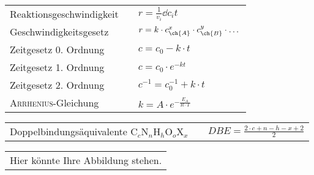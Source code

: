 \documentclass[./main.tex]{subfiles}
\begin{document}
\begin{formulabox}[Kinetik]
  \begin{center}
  \renewcommand{\arraystretch}{1.4}
    \begin{tabular}{>{\raggedleft\arraybackslash}p{} p{}p{}}
        Reaktionsgeschwindigkeit & & $\displaystyle r=\frac{1}{v_i}\dd{c_i}{t}$ \\
        Geschwindigkeitsgesetz & & $r=k\cdot c_{\ch{A}}^x\cdot c_{\ch{B}}^y \cdot \dots$ \\
        Zeitgesetz 0. Ordnung & & $c=c_0-k\cdot t$ \\
        Zeitgesetz 1. Ordnung & & $c=c_0\cdot e^{-kt}$ \\
        Zeitgesetz 2. Ordnung & & $c^{-1}=c_0^{-1}+k\cdot t$ \\
        \textsc{Arrhenius}-Gleichung & & $\displaystyle k=A\cdot e^{-\frac{E_A}{R\cdot T}}$ \\
    \end{tabular}
  \end{center}
\end{formulabox}

\begin{formulabox}
  \begin{center}
  \renewcommand{\arraystretch}{1.4}
    \begin{tabular}{>{\raggedleft\arraybackslash}p{} p{}p{}}
        Doppelbindungs\"aquivalente C$_c$N$_n$H$_h$O$_o$X$_x$ & & \multirow{2}{*}{$\displaystyle DBE=\frac{2\cdot c+n-h-x+2}{2}$}\\
    \end{tabular}
  \end{center}
\end{formulabox}

\begin{formulabox}
  \begin{center}
  \renewcommand{\arraystretch}{1.4}
    \begin{tabular}{c}
        Hier k\"onnte Ihre Abbildung stehen.
    \end{tabular}
  \end{center}
\end{formulabox}
\end{document}
